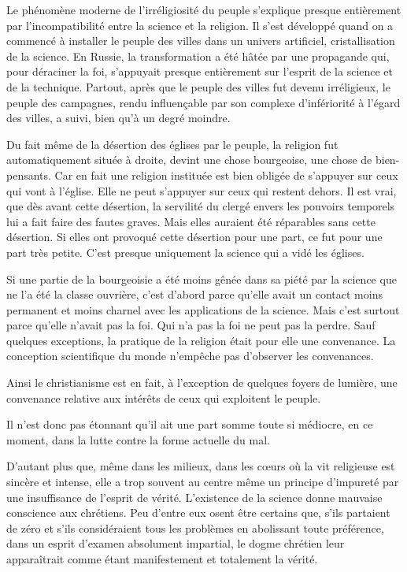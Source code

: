 \documentclass[french,twoside]{book} %
\begin{document}
\par
Le phénomène moderne de l'irréligiosité du peuple s'explique presque entièrement par l'incompatibilité entre la science et la religion. Il s'est développé quand on a commencé à installer le peuple des villes dans un univers artificiel, cristallisation de la science. En Russie, la transformation a été hâtée par une propagande qui, pour déraciner la foi, s'appuyait presque entièrement sur l'esprit de la science et de la technique. Partout, après que le peuple des villes fut devenu irréligieux, le peuple des campagnes, rendu influençable par son complexe d'infériorité à l'égard des villes, a suivi, bien qu'à un degré moindre.\par
Du fait même de la désertion des églises par le peuple, la religion fut automatiquement située à droite, devint une chose bourgeoise, une chose de bien-pensants. Car en fait une religion instituée est bien obligée de s'appuyer sur ceux qui vont à l'église. Elle ne peut s'appuyer sur ceux qui restent dehors. Il est vrai, que dès avant cette désertion, la servilité du clergé envers les pouvoirs temporels lui a fait faire des fautes graves. Mais elles auraient été réparables sans cette désertion. Si elles ont provoqué cette désertion pour une part, ce fut pour une part très petite. C'est presque uniquement la science qui a vidé les églises.\par
Si une partie de la bourgeoisie a été moins gênée dans sa piété par la science que ne l'a été la classe ouvrière, c'est d'abord parce qu'elle avait un contact moins permanent et moins charnel avec les applications de la science. Mais c'est surtout parce qu'elle n'avait pas la foi. Qui n'a pas la foi ne peut pas la perdre. Sauf quelques exceptions, la pratique de la religion était pour elle une convenance. La conception scientifique du monde n'empêche pas d'observer les convenances.\par
Ainsi le christianisme est en fait, à l'exception de quelques foyers de lumière, une convenance relative aux intérêts de ceux qui exploitent le peuple.\par
Il n'est donc pas étonnant qu'il ait une part somme toute si médiocre, en ce moment, dans la lutte contre la forme actuelle du mal.\par
D'autant plus que, même dans les milieux, dans les cœurs où la vit religieuse est sincère et intense, elle a trop souvent au centre même un principe d'impureté par une insuffisance de l'esprit de vérité. L'existence de la science donne mauvaise conscience aux chrétiens. Peu d'entre eux osent être certains que, s'ils partaient de zéro et s'ils considéraient tous les problèmes en abolissant toute préférence, dans un esprit d'examen absolument impartial, le dogme chrétien leur apparaîtrait comme étant manifestement et totalement la vérité.\par
\end{document}
